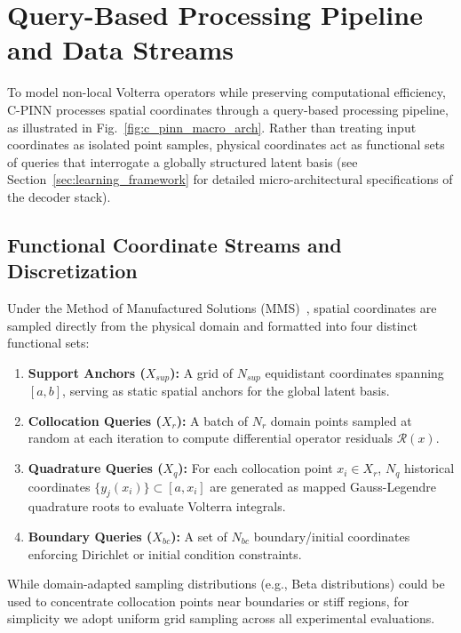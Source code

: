 
\section{Query-Based Processing Pipeline and Data Streams}
\label{sec:processing_pipeline}

To model non-local Volterra operators while preserving computational efficiency, C-PINN processes spatial coordinates through a query-based processing pipeline, as illustrated in Fig.~\ref{fig:c_pinn_macro_arch}. Rather than treating input coordinates as isolated point samples, physical coordinates act as functional sets of queries that interrogate a globally structured latent basis (see Section~\ref{sec:learning_framework} for detailed micro-architectural specifications of the decoder stack).

\subsection{Functional Coordinate Streams and Discretization}
Under the Method of Manufactured Solutions (MMS)~\cite{moghaddam2025risn}, spatial coordinates are sampled directly from the physical domain and formatted into four distinct functional sets:
\begin{enumerate}
    \item \textbf{Support Anchors ($X_{sup}$):} A grid of $N_{sup}$ equidistant coordinates spanning $[a, b]$, serving as static spatial anchors for the global latent basis.
    \item \textbf{Collocation Queries ($X_r$):} A batch of $N_r$ domain points sampled at random at each iteration to compute differential operator residuals $\mathcal{R}(x)$.
    \item \textbf{Quadrature Queries ($X_q$):} For each collocation point $x_i \in X_r$, $N_q$ historical coordinates $\{y_j(x_i)\} \subset [a, x_i]$ are generated as mapped Gauss-Legendre quadrature roots to evaluate Volterra integrals. 
    \item \textbf{Boundary Queries ($X_{bc}$):} A set of $N_{bc}$ boundary/initial coordinates enforcing Dirichlet or initial condition constraints.
\end{enumerate}
While domain-adapted sampling distributions (e.g., Beta distributions) could be used to concentrate collocation points near boundaries or stiff regions, for simplicity we adopt uniform grid sampling across all experimental evaluations.

